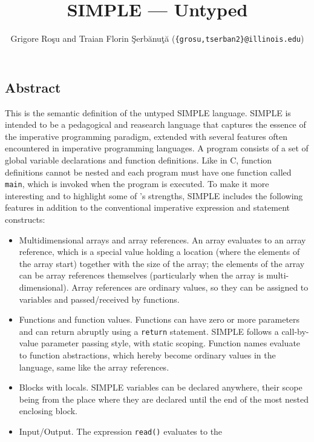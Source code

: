 
\setlength{\parindent}{1em}
\title{SIMPLE --- Untyped}
\author{Grigore Ro\c{s}u and 
        Traian Florin \c{S}erb\u{a}nu\c{t}\u{a} (\texttt{\{grosu,tserban2\}@illinois.edu})}

\maketitle

\begin{latexComment}
\section{Abstract}
This is the \K semantic definition of the untyped SIMPLE language.
SIMPLE is intended to be a pedagogical and reasearch language that captures
the essence of the imperative programming paradigm, extended with several
features often encountered in imperative programming languages.
A program consists of a set of global variable declarations and
function definitions.  Like in C, function definitions cannot be
nested and each program must have one function called \texttt{main},
which is invoked when the program is executed.  To make it more
interesting and to highlight some of \K's strengths, SIMPLE includes
the following features in addition to the conventional imperative
expression and statement constructs:
\begin{itemize}
\item Multidimensional arrays and array references.  An array evaluates
to an array reference, which is a special value holding a location (where
the elements of the array start) together with the size of the array;
the elements of the array can be array references themselves (particularly
when the array is multi-dimensional).  Array references are ordinary values,
so they can be assigned to variables and passed/received by functions.
\item Functions and function values.  Functions can have zero or
more parameters and can return abruptly using a \texttt{return} statement.
SIMPLE follows a call-by-value parameter passing style, with static scoping.
Function names evaluate to function abstractions, which hereby become ordinary
values in the language, same like the array references.
\item Blocks with locals.  SIMPLE variables can be declared
anywhere, their scope being from the place where they are declared
until the end of the most nested enclosing block.
\item Input/Output.  The expression \texttt{read()} evaluates to the

\end{itemize}
\end{latexComment}
